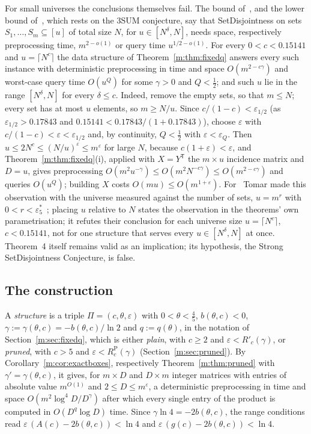 \documentclass[11pt]{article}
\theoremstyle{definition}
\theoremstyle{remark}
\newcommand{\es}{\varepsilon^*_5}
\newcommand{\HypHalfRfourteen}{0.17843}%
\newcommand{\SetDisjUnivC}{0.15141}%
\begin{document}
For small universes the conclusions themselves fail. The bound of~\cite[Theorem~4]{GLP19}, and the lower bound of~\cite[Theorem~7]{GLP19}, which rests on the 3SUM conjecture, say that SetDisjointness on sets $S_1,\dots,S_m\subseteq[u]$ of total size $N$, for $u\in[N^\delta,N]$, needs space, respectively preprocessing time, $m^{2-o(1)}$ or query time $u^{1/2-o(1)}$. For every $0<c<\SetDisjUnivC$ and $u=\lceil N^c\rceil$ the data structure of Theorem~\ref{m:thm:fixedq} answers every such instance with deterministic preprocessing in time and space $O(m^{2-c\gamma})$ and worst-case query time $O(u^Q)$ for some $\gamma>0$ and $Q<\frac12$; and such $u$ lie in the range $[N^\delta,N]$ for every $\delta\le c$. Indeed, remove the empty sets, so that $m\le N$; every set has at most $u$ elements, so $m\ge N/u$. Since $c/(1-c)<\varepsilon_{1/2}$ (as $\varepsilon_{1/2}>\HypHalfRfourteen$ and $\SetDisjUnivC<\HypHalfRfourteen/(1+\HypHalfRfourteen)$), choose $\varepsilon$ with $c/(1-c)<\varepsilon<\varepsilon_{1/2}$ and, by continuity, $Q<\frac12$ with $\varepsilon<\varepsilon_Q$. Then $u\le2N^c\le(N/u)^\varepsilon\le m^\varepsilon$ for large $N$, because $c(1+\varepsilon)<\varepsilon$, and Theorem~\ref{m:thm:fixedq}(i), applied with $X=Y^{\mathsf T}$ the $m\times u$ incidence matrix and $D=u$, gives preprocessing $O(m^2u^{-\gamma})\le O(m^2N^{-c\gamma})\le O(m^{2-c\gamma})$ and queries $O(u^Q)$; building $X$ costs $O(mu)\le O(m^{1+\varepsilon})$. For~\cite[Theorem~7]{GLP19} Tomar made this observation with the universe measured against the number of sets, $u=m^r$ with $0<r<\es$~\cite[Proposition~4.1]{Tom26}; placing $u$ relative to $N$ states the observation in the theorems' own parametrisation; it refutes their conclusion for each universe size $u=\lceil N^c\rceil$, $c<\SetDisjUnivC$, not for one structure that serves every $u\in[N^\delta,N]$ at once. Theorem~4 itself remains valid as an implication; its hypothesis, the Strong SetDisjointness Conjecture, is false.

\subsection{The construction}

A \emph{structure} is a triple $\Pi=(c,\theta,\varepsilon)$ with $0<\theta<\frac45$, $b(\theta,c)<0$, $\gamma:=\gamma(\theta,c)=-b(\theta,c)/\ln2$ and $q:=q(\theta)$, in the notation of Section~\ref{m:sec:fixedq}, which is either \emph{plain}, with $c\ge2$ and $\varepsilon<R'_c(\gamma)$, or \emph{pruned}, with $c>5$ and $\varepsilon<R^{\mathrm P}_c(\gamma)$ (Section~\ref{m:sec:pruned}). By Corollary~\ref{m:cor:exactboxes}, respectively Theorem~\ref{m:thm:pruned} with $\gamma'=\gamma(\theta,c)$, it gives, for $m\times D$ and $D\times m$ integer matrices with entries of absolute value $m^{O(1)}$ and $2\le D\le m^\varepsilon$, a deterministic preprocessing in time and space $O(m^2\log^4\!D/D^\gamma)$ after which every single entry of the product is computed in $O(D^q\log D)$ time. Since $\gamma\ln4=-2b(\theta,c)$, the range conditions read $\varepsilon\,(A(c)-2b(\theta,c))<\ln4$ and $\varepsilon\,(g(c)-2b(\theta,c))<\ln4$.
\end{document}
